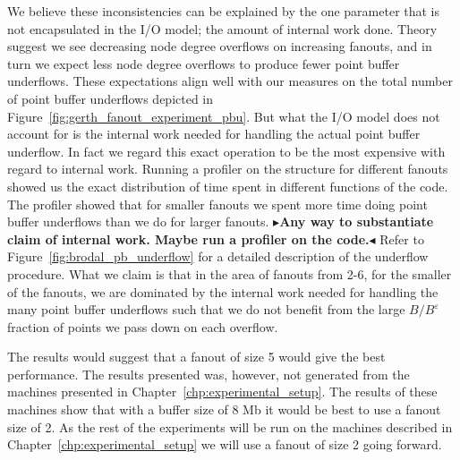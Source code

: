 \documentclass[twoside,11pt,openright]{report}
\def \epsilon {\varepsilon}
\newcommand{\todo}[1]{{\color[rgb]{.5,0,0}\textbf{$\blacktriangleright$#1$\blacktriangleleft$}}}
\begin{document}
We believe these inconsistencies can be explained by the one parameter that is not encapsulated in the I/O model; the amount of internal work done. Theory suggest we see decreasing node degree overflows on increasing fanouts, and in turn we expect less node degree overflows to produce fewer point buffer underflows. These expectations align well with our measures on the total number of point buffer underflows depicted in Figure~\ref{fig:gerth_fanout_experiment_pbu}. But what the I/O model does not account for is the internal work needed for handling the actual point buffer underflow. In fact we regard this exact operation to be the most expensive with regard to internal work. 
Running a profiler on the structure for different fanouts showed us the exact distribution of time spent in different functions of the code. The profiler showed that for smaller fanouts we spent more time doing point buffer underflows than we do for larger fanouts.
\todo{Any way to substantiate claim of internal work. Maybe run a profiler on the code.} Refer to Figure~\ref{fig:brodal_pb_underflow} for a detailed description of the underflow procedure. What we claim is that in the area of fanouts from 2-6, for the smaller of the fanouts, we are dominated by the internal work needed for handling the many point buffer underflows such that we do not benefit from the large $B / B^\epsilon$ fraction of points we pass down on each overflow.

The results would suggest that a fanout of size 5 would give the best performance.
The results presented was, however, not generated from the machines presented in Chapter~\ref{chp:experimental_setup}. The results of these machines show that with a buffer size of 8 Mb it would be best to use a fanout size of 2. As the rest of the experiments will be run on the machines described in Chapter~\ref{chp:experimental_setup} we will use a fanout of size 2 going forward.
\end{document}
